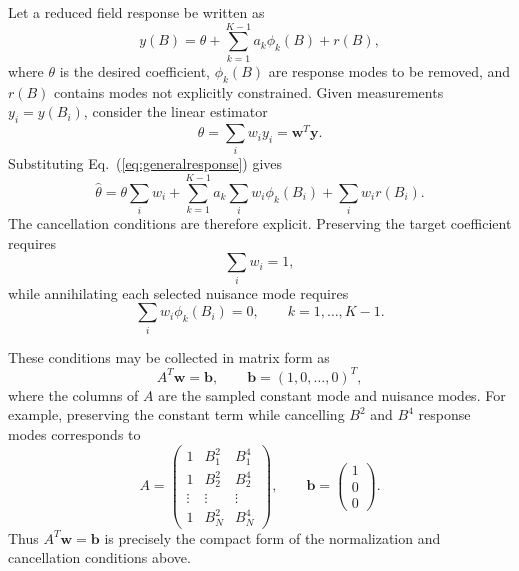 \documentclass[aps,prd,preprint,nofootinbib,floatfix]{revtex4-2}
\begin{document}
Let a reduced field response be written as
\begin{equation}
y(B)=\theta+\sum_{k=1}^{K-1}a_k\phi_k(B)+r(B),
\label{eq:generalresponse}
\end{equation}
where $\theta$ is the desired coefficient, $\phi_k(B)$ are response
modes to be removed, and $r(B)$ contains modes not explicitly constrained.
Given measurements $y_i=y(B_i)$, consider the linear estimator
\begin{equation}
\widehat{\theta}
=
\sum_i w_i y_i
=
\bm w^T\bm y.
\label{eq:linear_estimator}
\end{equation}
Substituting Eq.~(\ref{eq:generalresponse}) gives
\begin{equation}
\widehat{\theta}
=
\theta\sum_i w_i
+
\sum_{k=1}^{K-1}a_k\sum_i w_i\phi_k(B_i)
+
\sum_i w_i r(B_i).
\label{eq:constraint_expansion}
\end{equation}
The cancellation conditions are therefore explicit. Preserving the
target coefficient requires
\begin{equation}
\sum_i w_i=1,
\label{eq:preserve_target}
\end{equation}
while annihilating each selected nuisance mode requires
\begin{equation}
\sum_i w_i\phi_k(B_i)=0,
\qquad k=1,\ldots,K-1.
\label{eq:annihilate_modes}
\end{equation}

These conditions may be collected in matrix form as
\begin{equation}
A^T\bm w=\bm b,
\qquad
\bm b=(1,0,\ldots,0)^T,
\label{eq:constraints}
\end{equation}
where the columns of $A$ are the sampled constant mode and nuisance
modes. For example, preserving the constant term while cancelling
$B^2$ and $B^4$ response modes corresponds to
\begin{equation}
A=
\begin{pmatrix}
1 & B_1^2 & B_1^4\\
1 & B_2^2 & B_2^4\\
\vdots & \vdots & \vdots\\
1 & B_N^2 & B_N^4
\end{pmatrix},
\qquad
\bm b=
\begin{pmatrix}
1\\
0\\
0
\end{pmatrix}.
\label{eq:example_design}
\end{equation}
Thus $A^T\bm w=\bm b$ is precisely the compact form of the
normalization and cancellation conditions above.
\end{document}
